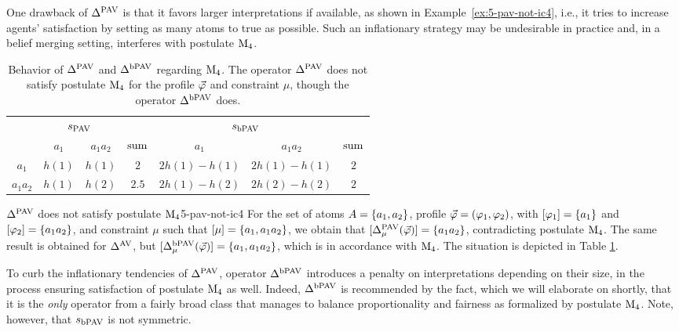 One drawback of $\me^{\pav}$ is that %
it favors larger interpretations if available, as shown in Example~\ref{ex:5-pav-not-ic4},
i.e., it tries to increase agents' satisfaction by setting as many atoms to true as possible. 
Such an inflationary strategy may be undesirable in practice and, 
in a belief merging setting, interferes with postulate $\ppm{4}$.

\begin{table}\centering
		\begin{tabular}{ccccccc}
			\toprule
			& \multicolumn{2}{c}{$\sat_\pav$} && \multicolumn{2}{c}{$\sat_\bpav$}&\\
			& $a_1$ & $a_1a_2$ & $\ssum$ & $a_1$ & $a_1a_2$ & $\ssum$\\
			\midrule
			$a_1$       & $h(1)$ & $h(1)$  &  $2$ &  $2h(1)-h(1)$ & $2h(1)-h(1)$ & $2$\\
			$a_1a_2$    & $h(1)$ &	$h(2)$ &  $2.5$  & $2h(1)-h(2)$ & $2h(2)-h(2)$ & $2$\\
			\bottomrule				
		\end{tabular}
	\caption{
		Behavior of $\me^{\pav}$ and $\me^{\bpav}$ regarding $\ppm{4}$. 
		The operator $\me^{\pav}$ does not satisfy postulate $\ppm{4}$ for
		the profile $\P$ and constraint $\mu$, though the operator $\me^{\bpav}$ does.
	}	
	\label{tab:5-pav-not-ic4}		
\end{table}

\begin{xmpl}{$\me^{\pav}$ does not satisfy postulate $\ppm{4}$}{5-pav-not-ic4}
	For the set of atoms $\Atoms=\set{a_1,a_2}$, 
	profile $\P=(\phi_1,\phi_2)$,
	with $\mods{\phi_1}=\set{a_1}$ and $\mods{\phi_2}=\set{a_1a_2}$,
	and constraint $\mu$ such that $[\mu]=\set{a_1,a_1a_2}$,
	we obtain that $\mods{\me^{\pav}_{\mu}(\P)}=\set{a_1a_2}$,
	contradicting postulate $\ppm{4}$.
	The same result is obtained for $\me^{\av}$,
	but $\mods{\me^{\bpav}_{\mu}(\P)}=\set{a_1,a_1a_2}$,
	which is in accordance with $\ppm{4}$.
	The situation is depicted in Table \ref{tab:5-pav-not-ic4}.
\end{xmpl}

To curb the inflationary tendencies of $\me^{\pav}$, 
operator $\me^{\bpav}$ introduces a penalty on interpretations depending on their size, 
in the process ensuring satisfaction of postulate $\ppm{4}$ as well.
Indeed, $\me^{\bpav}$ is recommended by the fact, which we will elaborate on shortly, 
that it is the \emph{only} operator 
from a fairly broad class that manages to balance proportionality and fairness
as formalized by postulate $\ppm{4}$.
Note, however, that $\sat_\bpav$ is not symmetric.

